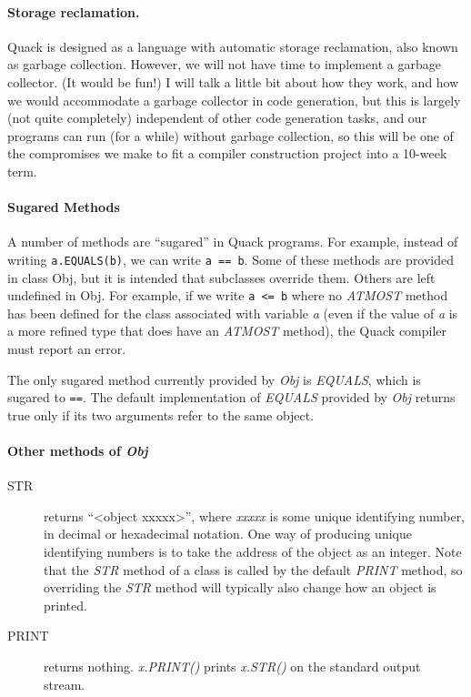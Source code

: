 \documentclass[11pt]{article}
\begin{document}
\paragraph{Storage reclamation.}  Quack is designed as a language with
automatic storage reclamation, also known as garbage collection.  
However, we will not have time to implement a garbage collector.  (It
would be fun!)  I will talk a little bit about how they work, and how
we would accommodate a garbage collector in code generation, but this
is largely (not quite completely) independent of other code generation
tasks, and our programs can run (for a while) without garbage
collection, so this will be one of the compromises we make to fit a
compiler construction project into a 10-week term.  

\paragraph{Sugared Methods}

A number of methods are ``sugared'' in Quack
programs.  For example, instead of writing \verb|a.EQUALS(b)|, we can
write \verb|a == b|.   Some of these methods are provided in class
Obj, but it is intended that subclasses override them.  Others are
left undefined in Obj.  For example, if we write \verb|a <= b| where
no \emph{ATMOST} method has been defined for the class associated with
variable \emph{a}  (even if the value of \emph{a} is a more refined
type that does have an \emph{ATMOST} method), the Quack compiler must
report an error. 

The only sugared method currently provided by \emph{Obj} is
\emph{EQUALS}, which is sugared to \verb|==|.  The default 
implementation of \emph{EQUALS} provided by \emph{Obj} returns 
true only if its two arguments refer to the same object.  

\paragraph{Other methods of \emph{Obj}}

\begin{description}
\item[STR] returns ``<object xxxxx>'', where \emph{xxxxx} is some
unique identifying number, in decimal or hexadecimal notation.  One
way of producing unique identifying numbers is to take the address of 
the object as an integer.  Note that the \emph{STR} method of a class 
is called by the default \emph{PRINT} method, so overriding the 
\emph{STR} method will typically also change how an object is
printed. 
\item[PRINT] returns nothing.  \emph{x.PRINT()} prints \emph{x.STR()}
  on the standard output stream.  
\end{description}
\end{document}
